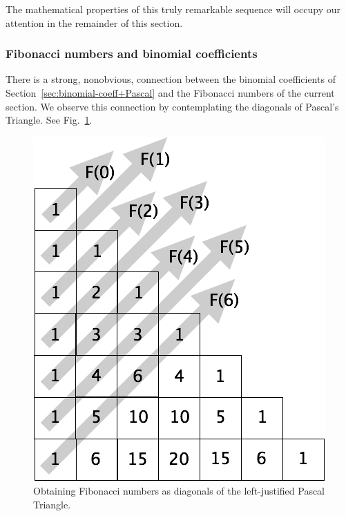 The mathematical properties of this truly remarkable sequence will
occupy our attention in the remainder of this section.


\subsubsection{Fibonacci numbers and binomial coefficients}
\label{sec:FibNo+BinomCoeff}


There is a strong, nonobvious, connection between the binomial
coefficients of Section~\ref{sec:binomial-coeff+Pascal} and the
Fibonacci numbers of the current section.  We observe this connection
by contemplating the diagonals of Pascal's Triangle.  See
Fig.~\ref{fig:FiboPascal}.
\begin{figure}[htb]
\begin{center}
        \includegraphics[scale=0.3]{FiguresMaths//FiboPascal1}
\caption{Obtaining Fibonacci numbers as diagonals of the left-justified Pascal Triangle.}
\label{fig:FiboPascal}
\end{center}
\end{figure}

